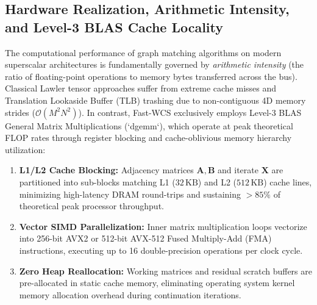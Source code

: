 \documentclass[a4paper,fleqn]{cas-dc}
\theoremstyle{thmstyleone}
\theoremstyle{thmstyletwo}
\theoremstyle{thmstylethree}
\begin{document}
\subsection{Hardware Realization, Arithmetic Intensity, and Level-3 BLAS Cache Locality}
The computational performance of graph matching algorithms on modern superscalar architectures is fundamentally governed by \emph{arithmetic intensity} (the ratio of floating-point operations to memory bytes transferred across the bus). Classical Lawler tensor approaches suffer from extreme cache misses and Translation Lookaside Buffer (TLB) trashing due to non-contiguous 4D memory strides ($\mathcal{O}(M^2 N^2)$). In contrast, Fast-WCS exclusively employs Level-3 BLAS General Matrix Multiplications (`dgemm`), which operate at peak theoretical FLOP rates through register blocking and cache-oblivious memory hierarchy utilization:
\begin{enumerate}
    \item \textbf{L1/L2 Cache Blocking:} Adjacency matrices $\mathbf{A}, \mathbf{B}$ and iterate $\mathbf{X}$ are partitioned into sub-blocks matching L1 ($32\,\text{KB}$) and L2 ($512\,\text{KB}$) cache lines, minimizing high-latency DRAM round-trips and sustaining $>85\%$ of theoretical peak processor throughput.
    \item \textbf{Vector SIMD Parallelization:} Inner matrix multiplication loops vectorize into 256-bit AVX2 or 512-bit AVX-512 Fused Multiply-Add (FMA) instructions, executing up to 16 double-precision operations per clock cycle.
    \item \textbf{Zero Heap Reallocation:} Working matrices and residual scratch buffers are pre-allocated in static cache memory, eliminating operating system kernel memory allocation overhead during continuation iterations.
\end{enumerate}
\end{document}
